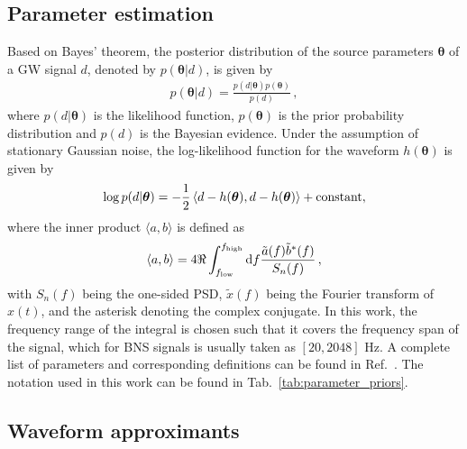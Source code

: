 \documentclass[prd,twocolumn,a4paper,floatfix,nofootinbib,preprintnumbers,superscriptaddress]{revtex4-1}
\newcommand*\diff{\mathop{}\!\mathrm{d}}
\begin{document}
\subsection{Parameter estimation}
\noindent Based on Bayes' theorem, the posterior distribution of the source parameters $\boldsymbol{\theta}$ of a \ac{GW} signal $d$, denoted by $p(\boldsymbol{\theta}|d)$, is given by 
\cite{Veitch:2009hd}
\begin{equation}
\begin{aligned}
    p(\boldsymbol{\theta}|d) = \frac{p(d|\boldsymbol{\theta})p(\boldsymbol{\theta})}{p(d)} \,,
\end{aligned}
\end{equation}
where $p(d|\boldsymbol{\theta})$ is the likelihood function, $p(\boldsymbol{\theta})$ is the prior probability distribution and $p(d)$ is the Bayesian evidence. Under the assumption of stationary Gaussian noise, the log-likelihood function for the waveform $h(\boldsymbol{\theta})$ is given by
\begin{equation}\label{eq: likelihood function}
    \log p(d|\boldsymbol{\theta}) = - \frac12 \left\langle d - h(\boldsymbol{\theta}), d - h(\boldsymbol{\theta}) \right\rangle + {\rm constant},
\end{equation}
where the inner product $\langle a, b \rangle$ is defined as
\begin{equation}\label{eq:noise_weighted_inner_product}
    \langle a, b \rangle = 4 \real \int_{f_{\rm low}}^{f_{\rm high}} \diff f \frac{\tilde{a}(f) \tilde{b}^*(f)}{S_n(f)} \, , 
\end{equation}
with $S_n(f)$ being the one-sided \ac{PSD}, $\tilde{x}(f)$ being the Fourier transform of $x(t)$, and the asterisk denoting the complex conjugate. In this work, the frequency range of the integral is chosen such that it covers the frequency span of the signal, which for \ac{BNS} signals is usually taken as $[20, 2048]$ Hz. A complete list of parameters and corresponding definitions can be found in Ref.~\cite{Romero-Shaw:2020owr}. The notation used in this work can be found in Tab.~\ref{tab:parameter_priors}. 

\subsection{Waveform approximants}
\end{document}
